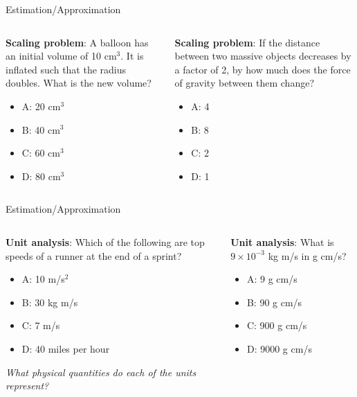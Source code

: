 \documentclass{beamer}
\begin{document}
\begin{frame}{Estimation/Approximation}
\small
\begin{columns}[T]
\begin{column}{0.5\textwidth}
\textbf{Scaling problem}: A balloon has an initial volume of 10 cm$^3$.  It is inflated such that the radius doubles.  What is the new volume?
\begin{itemize}
\item A: 20 cm$^3$
\item B: 40 cm$^3$
\item C: 60 cm$^3$
\item D: 80 cm$^3$
\end{itemize}
\end{column}
\begin{column}{0.5\textwidth}
\textbf{Scaling problem}: If the distance between two massive objects decreases by a factor of 2, by how much does the force of gravity between them change?
\vspace{0.55cm}
\begin{itemize}
\item A: 4
\item B: 8
\item C: 2
\item D: 1
\end{itemize}
\end{column}
\end{columns}
\end{frame}

\begin{frame}{Estimation/Approximation}
\small
\begin{columns}[T]
\begin{column}{0.5\textwidth}
\textbf{Unit analysis}: Which of the following are top speeds of a runner at the end of a sprint?
\begin{itemize}
\item A: 10 m/s$^2$
\item B: 30 kg m/s
\item C: 7 m/s
\item D: 40 miles per hour
\end{itemize}
\textit{What physical quantities do each of the units represent?}
\end{column}
\begin{column}{0.5\textwidth}
\textbf{Unit analysis}: What is $9\times 10^{-3}$ kg m/s in g cm/s?
\vspace{0.55cm}
\begin{itemize}
\item A: 9 g cm/s
\item B: 90 g cm/s
\item C: 900 g cm/s
\item D: 9000 g cm/s
\end{itemize}
\end{column}
\end{columns}
\end{frame}
\end{document}
